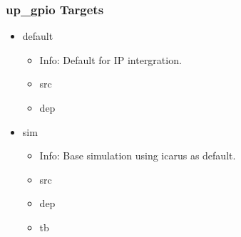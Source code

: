 \subsubsection{up\_gpio Targets}
\begin{itemize}
\item default
	\begin{itemize}
	\item[$\space$] Info: Default for IP intergration.
	\item src
	\item dep
	\end{itemize}
\item sim
	\begin{itemize}
	\item[$\space$] Info: Base simulation using icarus as default.
	\item src
	\item dep
	\item tb
	\end{itemize}
\end{itemize}
